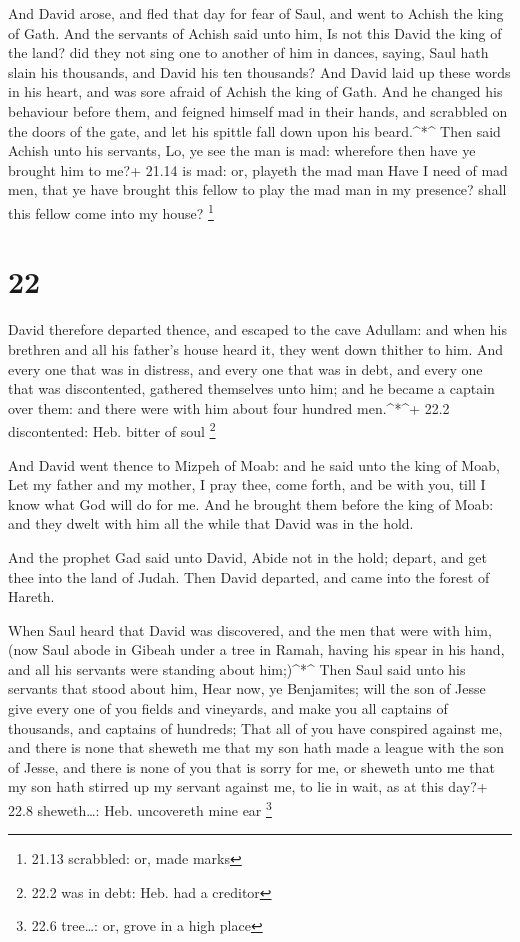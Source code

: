  And David arose, and fled that day for fear of Saul, and
went to Achish the king of Gath.  And the servants of
Achish said unto him, Is not this David the king of the land? did they
not sing one to another of him in dances, saying, Saul hath slain his
thousands, and David his ten thousands?  And David laid up
these words in his heart, and was sore afraid of Achish the king of
Gath.  And he changed his behaviour before them, and
feigned himself mad in their hands, and scrabbled on the doors of the
gate, and let his spittle fall down upon his beard.\^{}*\^{}
 Then said Achish unto his servants, Lo, ye see the man is
mad: wherefore then have ye brought him to me?+ 21.14 is mad: or,
playeth the mad man  Have I need of mad men, that ye have
brought this fellow to play the mad man in my presence? shall this
fellow come into my house? \footnote{21.13 scrabbled: or, made marks}

\hypertarget{section-21}{%
\section{22}\label{section-21}}

 David therefore departed thence, and escaped to the cave
Adullam: and when his brethren and all his father's house heard it, they
went down thither to him.  And every one that was in
distress, and every one that was in debt, and every one that was
discontented, gathered themselves unto him; and he became a captain over
them: and there were with him about four hundred men.\^{}*\^{}+ 22.2
discontented: Heb. bitter of soul \footnote{22.2 was in debt: Heb. had a
  creditor}

 And David went thence to Mizpeh of Moab: and he said unto
the king of Moab, Let my father and my mother, I pray thee, come forth,
and be with you, till I know what God will do for me.  And
he brought them before the king of Moab: and they dwelt with him all the
while that David was in the hold.

 And the prophet Gad said unto David, Abide not in the hold;
depart, and get thee into the land of Judah. Then David departed, and
came into the forest of Hareth.

 When Saul heard that David was discovered, and the men that
were with him, (now Saul abode in Gibeah under a tree in Ramah, having
his spear in his hand, and all his servants were standing about
him;)\^{}*\^{}  Then Saul said unto his servants that stood
about him, Hear now, ye Benjamites; will the son of Jesse give every one
of you fields and vineyards, and make you all captains of thousands, and
captains of hundreds;  That all of you have conspired
against me, and there is none that sheweth me that my son hath made a
league with the son of Jesse, and there is none of you that is sorry for
me, or sheweth unto me that my son hath stirred up my servant against
me, to lie in wait, as at this day?+ 22.8 sheweth\ldots: Heb. uncovereth
mine ear \footnote{22.6 tree\ldots: or, grove in a high place}

